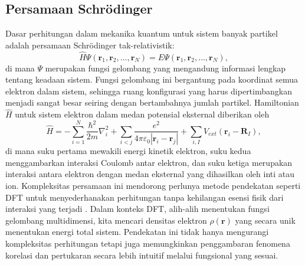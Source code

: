 \subsection{Persamaan Schrödinger}
Dasar perhitungan dalam mekanika kuantum untuk sistem banyak partikel adalah persamaan Schrödinger tak-relativistik:
\begin{equation}
    \hat{H}\Psi(\mathbf{r}_1,\mathbf{r}_2,\ldots,\mathbf{r}_N) = E\Psi(\mathbf{r}_1,\mathbf{r}_2,\ldots,\mathbf{r}_N),
\end{equation}
di mana \(\Psi\) merupakan fungsi gelombang yang mengandung informasi lengkap tentang keadaan sistem.
Fungsi gelombang ini bergantung pada koordinat semua elektron dalam sistem, sehingga ruang konfigurasi yang harus dipertimbangkan menjadi sangat besar seiring dengan bertambahnya jumlah partikel.
Hamiltonian \(\hat{H}\) untuk sistem elektron dalam medan potensial eksternal diberikan oleh
\begin{equation}
    \hat{H} = -\sum_{i=1}^{N}\frac{\hbar^2}{2m}\nabla_i^2 + \sum_{i<j} \frac{e^2}{4\pi\varepsilon_0|\mathbf{r}_i-\mathbf{r}_j|} + \sum_{i,I} V_{ext}(\mathbf{r}_i-\mathbf{R}_I),
\end{equation}
di mana suku pertama mewakili energi kinetik elektron, suku kedua menggambarkan interaksi Coulomb antar elektron, dan suku ketiga merupakan interaksi antara elektron dengan medan eksternal yang dihasilkan oleh inti atau ion.
Kompleksitas persamaan ini mendorong perlunya metode pendekatan seperti DFT untuk menyederhanakan perhitungan tanpa kehilangan esensi fisik dari interaksi yang terjadi \cite{Kohn1965}.
Dalam konteks DFT, alih-alih menentukan fungsi gelombang multidimensi, kita mencari densitas elektron \(\rho(\mathbf{r})\) yang secara unik menentukan energi total sistem.
Pendekatan ini tidak hanya mengurangi kompleksitas perhitungan tetapi juga memungkinkan penggambaran fenomena korelasi dan pertukaran secara lebih intuitif melalui fungsional yang sesuai.

